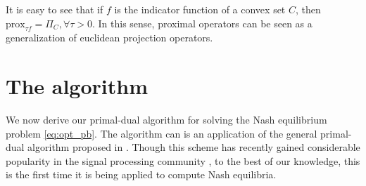 \documentclass{article} %
\begin{document}
It is easy to see that if $f$ is the indicator function of a convex set $C$, then $\text{prox}_{\tau f} = \Pi_C, \forall \tau > 0$. In this sense, proximal operators can be seen
as a generalization of euclidean projection operators.

\section{The algorithm}
We now derive our primal-dual algorithm for solving the Nash equilibrium problem \eqref{eq:opt_pb}. The algorithm can is an application of the general primal-dual algorithm proposed in \cite{chambolle2010}. Though this scheme has recently gained considerable popularity in the signal processing community \cite{gramfort-etal:2013a, dohmatob2014benchmarking}, to the best of our knowledge, this is the first time it is being applied to compute Nash equilibria.
\end{document}
